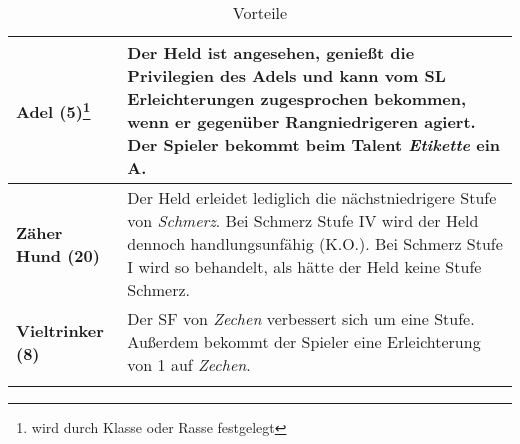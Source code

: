 \begin{longtable}{|p{5cm}|p{11cm}|}
\textbf{Adel (5)\footnote{wird durch Klasse oder Rasse festgelegt}} & Der Held ist angesehen, genießt die Privilegien des Adels und kann vom SL Erleichterungen zugesprochen bekommen, wenn er gegenüber Rangniedrigeren agiert. Der Spieler bekommt beim Talent \textit{Etikette} ein A. \\ \hline

\textbf{Zäher Hund (20)} & Der Held erleidet lediglich die nächstniedrigere Stufe von \textit{Schmerz}. Bei Schmerz Stufe IV wird der Held dennoch handlungsunfähig (K.O.). Bei Schmerz Stufe I wird so behandelt, als hätte der Held keine Stufe Schmerz. \\ \hline

\textbf{Vieltrinker (8)} & Der SF von \textit{Zechen} verbessert sich um eine Stufe. Außerdem bekommt der Spieler eine Erleichterung von 1 auf \textit{Zechen}. \\ \hline

\caption{Vorteile}
\label{tab:Vorteile}
\end{longtable}

